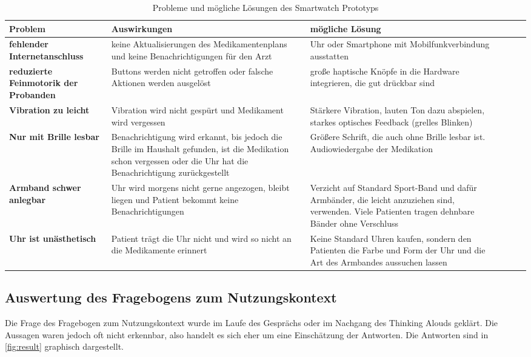 \begin{table}[]
\centering
\caption{Probleme und mögliche Lösungen des Smartwatch Prototyps}
\label{ch:problems}
\begin{tabular}{p{4cm} p{5cm} p{5cm}|l|l|l|}
\hline
 Problem  &Auswirkungen  &mögliche Lösung  \\ \hline
 \textbf{fehlender Internetanschluss}  &keine Aktualisierungen des Medikamentenplans und keine Benachrichtigungen für den Arzt &Uhr oder Smartphone mit Mobilfunkverbindung ausstatten  \\
 \textbf{reduzierte Feinmotorik der Probanden} &Buttons werden nicht getroffen oder falsche Aktionen werden ausgelöst  &große haptische Knöpfe in die Hardware integrieren, die gut drückbar sind  \\
 \textbf{Vibration zu leicht}&Vibration wird nicht gespürt und Medikament wird vergessen  &Stärkere Vibration, lauten Ton dazu abspielen, starkes optisches Feedback (grelles Blinken)   \\
 \textbf{Nur mit Brille lesbar} &Benachrichtigung wird erkannt, bis jedoch die Brille im Haushalt gefunden, ist die Medikation schon vergessen oder die Uhr hat die Benachrichtigung zurückgestellt  &Größere Schrift, die auch ohne Brille lesbar ist. Audiowiedergabe der Medikation  \\
 \textbf{Armband schwer anlegbar}&Uhr wird morgens nicht gerne angezogen,  bleibt liegen und Patient bekommt keine Benachrichtigungen  &Verzicht auf Standard Sport-Band und dafür Armbänder, die leicht anzuziehen sind, verwenden. Viele Patienten tragen dehnbare Bänder ohne Verschluss \\
 \textbf{Uhr ist unästhetisch}&Patient trägt die Uhr nicht und wird so nicht an die Medikamente erinnert  &Keine Standard Uhren kaufen, sondern den Patienten die Farbe und Form der Uhr und die Art des Armbandes aussuchen lassen  \\ \hline
\end{tabular}
\end{table}
\subsection{Auswertung des Fragebogens zum Nutzungskontext}
Die Frage des Fragebogen zum Nutzungskontext wurde im Laufe des Gesprächs oder im Nachgang des Thinking Alouds geklärt. Die Aussagen waren jedoch oft nicht erkennbar, also handelt es sich eher um eine Einschätzung der Antworten. Die Antworten sind in \ref{fig:result} graphisch dargestellt.


